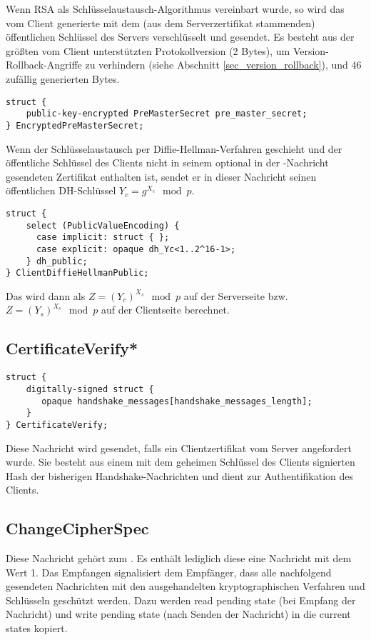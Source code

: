 Wenn RSA als Schlüsselaustausch-Algorithmus vereinbart wurde, so wird das vom Client generierte \premastersecret{} mit dem (aus dem Serverzertifikat stammenden) öffentlichen Schlüssel des Servers verschlüsselt und gesendet. Es besteht aus der größten vom Client unterstützten Protokollversion (2 Bytes), um Version-Rollback-Angriffe zu verhindern (siehe Abschnitt \ref{sec_version_rollback}), und 46 zufällig generierten Bytes.

\begin{lstlisting}
struct {
	public-key-encrypted PreMasterSecret pre_master_secret;
} EncryptedPreMasterSecret;
\end{lstlisting}

Wenn der Schlüsselaustausch per Diffie-Hellman-Verfahren geschieht und der öffentliche Schlüssel des Clients nicht in seinem optional in der \clientcertificate{}-Nachricht gesendeten Zertifikat enthalten ist, sendet er in dieser Nachricht seinen öffentlichen DH-Schlüssel \(Y_c = g^{X_c} \mod{p}\).

\begin{lstlisting}
struct {
	select (PublicValueEncoding) {
	  case implicit: struct { };
	  case explicit: opaque dh_Yc<1..2^16-1>;
	} dh_public;
} ClientDiffieHellmanPublic;
\end{lstlisting}

Das \premastersecret{} wird dann als \(Z=(Y_c)^{X_s} \mod{p}\) auf der Serverseite bzw. \(Z=(Y_s)^{X_c} \mod{p}\) auf der Clientseite berechnet.

\subsection{CertificateVerify*}

\begin{lstlisting}
struct {
	digitally-signed struct {
	   opaque handshake_messages[handshake_messages_length];
	}
} CertificateVerify;
\end{lstlisting}

Diese Nachricht wird gesendet, falls ein Clientzertifikat vom Server angefordert wurde. Sie besteht aus einem mit dem geheimen Schlüssel des Clients signierten Hash der bisherigen Handshake-Nachrichten und dient zur Authentifikation des Clients.

\subsection{ChangeCipherSpec}

Diese Nachricht gehört zum \changecipherspecprotocol{}. Es enthält lediglich diese eine Nachricht mit dem Wert 1. Das Empfangen signalisiert dem Empfänger, dass alle nachfolgend gesendeten Nachrichten mit den ausgehandelten kryptographischen Verfahren und Schlüsseln geschützt werden. Dazu werden read pending state (bei Empfang der Nachricht) und write pending state (nach Senden der Nachricht) in die current states kopiert.

